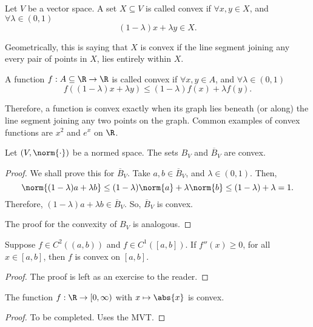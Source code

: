 \documentclass[draft]{penrose}
\newcommand{\oB}{B}
\newcommand{\cB}{\overline{B}}
\begin{document}
\begin{ndfn}
  Let $V$ be a vector space. A set $X \subseteq V$ is called convex if $\forall x,y \in X$, and $\forall \lambda \in (0,1)$
  \begin{equation*}
    (1-\lambda) x + \lambda y \in X.
  \end{equation*}
\end{ndfn}
Geometrically, this is saying that $X$ is convex if the line segment joining any every pair of points in $X$, lies entirely within $X$.

\begin{ndfn}
  A function $f : A \subseteq \R \to \R$ is called convex if $\forall x,y \in A$, and $\forall \lambda \in (0,1)$
  \begin{equation*}
    f\left((1-\lambda) x + \lambda y\right) \leq (1-\lambda) f(x) + \lambda f(y).
  \end{equation*}
\end{ndfn}
Therefore, a function is convex exactly when its graph lies beneath (or along) the line segment joining any two points on the graph. Common examples of convex functions are $x^2$ and $e^x$ on $\R$.

\begin{nprop}
  Let $(V, \norm{\cdot})$ be a normed space. The sets $\oB_{V}$ and $\cB_{V}$ are convex.
\end{nprop}
\begin{proof}
  We shall prove this for $\cB_{V}$. Take $a, b \in \cB_{V}$, and $\lambda \in (0,1)$. Then,
  \begin{equation*}
    \norm{(1-\lambda) a + \lambda b}
    \leq (1-\lambda) \norm{a} + \lambda \norm{b}
    \leq (1-\lambda) + \lambda
     = 1.
  \end{equation*}
  Therefore, $(1-\lambda) a + \lambda b \in \cB_{V}$. So, $\cB_{V}$ is convex.

  The proof for the convexity of $\oB_{V}$ is analogous.
\end{proof}

\begin{nprop}
\label{thm:convexity}
  Suppose $f \in C^2 ((a,b))$ and $f \in C^1 ([a,b])$. If $f''(x) \geq 0$, for all $x \in [a,b]$, then $f$ is convex on $[a,b]$.
\end{nprop}
\begin{proof}
  The proof is left as an exercise to the reader.
\end{proof}

\begin{nlemma}
  The function $f : \R \to [0,\infty)$ with $x \mapsto \abs{x}$ is convex.
\end{nlemma}
\begin{proof}
  To be completed. Uses the MVT.
\end{proof}
\end{document}
